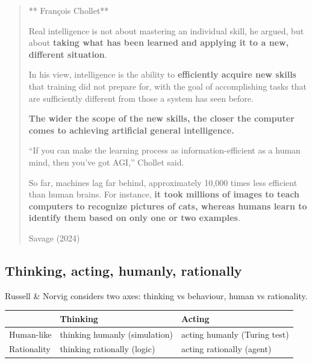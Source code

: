 \documentclass[
  letterpaper,
  DIV=11,
  numbers=noendperiod]{scrartcl}
\begin{document}
\begin{quote}
** François Chollet**

Real intelligence is not about mastering an individual skill, he argued,
but about \textbf{taking what has been learned and applying it to a new,
different situation}.

In his view, intelligence is the ability to \textbf{efficiently acquire
new skills} that training did not prepare for, with the goal of
accomplishing tasks that are sufficiently different from those a system
has seen before.

\textbf{The wider the scope of the new skills, the closer the computer
comes to achieving artificial general intelligence.}

``If you can make the learning process as information-efficient as a
human mind, then you've got AGI,'' Chollet said.

So far, machines lag far behind, approximately 10,000 times less
efficient than human brains. For instance, \textbf{it took millions of
images to teach computers to recognize pictures of cats, whereas humans
learn to identify them based on only one or two examples}.

Savage (2024)
\end{quote}

\subsection{Thinking, acting, humanly,
rationally}\label{thinking-acting-humanly-rationally}

Russell \& Norvig considers two axes: thinking vs behaviour, human vs
rationality.

\begin{longtable}[]{@{}
  >{\raggedright\arraybackslash}p{}
  >{\raggedright\arraybackslash}p{}
  >{\raggedright\arraybackslash}p{}@{}}
\toprule\noalign{}
\begin{minipage}[b]{\linewidth}\raggedright
\end{minipage} & \begin{minipage}[b]{\linewidth}\raggedright
Thinking
\end{minipage} & \begin{minipage}[b]{\linewidth}\raggedright
Acting
\end{minipage} \\
\midrule\noalign{}
\endhead
\bottomrule\noalign{}
\endlastfoot
Human-like & thinking humanly (simulation) & acting humanly (Turing
test) \\
Rationality & thinking rationally (logic) & acting rationally (agent) \\
\end{longtable}
\end{document}
